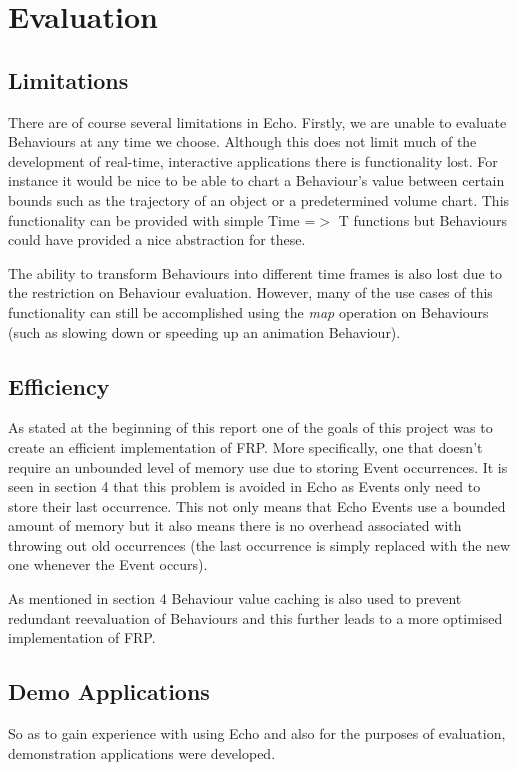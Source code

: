 \chapter{Evaluation}    
  \section{Limitations}
    There are of course several limitations in Echo. Firstly, we are unable to evaluate Behaviours at any time
    we choose.
    Although this does not limit much of the development of real-time, interactive applications there is functionality
    lost. For instance it would be nice to be able to chart a Behaviour's value between certain bounds such as
    the trajectory of an object or a predetermined volume chart. This functionality can be provided with simple
    Time =$>$ T functions but Behaviours could have provided a nice abstraction for these.
    
    The ability to transform Behaviours into different time frames is also lost due to the restriction on Behaviour
    evaluation. However, many of the use cases of this functionality can still be accomplished using the
    \emph{map} operation on Behaviours (such as slowing down or speeding up an animation Behaviour).
    
  \section{Efficiency}
    As stated at the beginning of this report one of the goals of this project was to create an efficient implementation
    of FRP. More specifically, one that doesn't require an unbounded level of memory use due to storing Event occurrences.
    It is seen in section 4 that this problem is avoided in Echo as Events only need to store their last
    occurrence. This not only means that Echo Events use a bounded amount of memory but it also means there is
    no overhead associated with throwing out old occurrences (the last occurrence is simply replaced with the new 
    one whenever the Event occurs).
    
    As mentioned in section 4 Behaviour value caching is also used to prevent redundant reevaluation of Behaviours
    and this further leads to a more optimised implementation of FRP.
  
  \section{Demo Applications}
    So as to gain experience with using Echo and also for the purposes of evaluation, demonstration
    applications were developed. 
    
